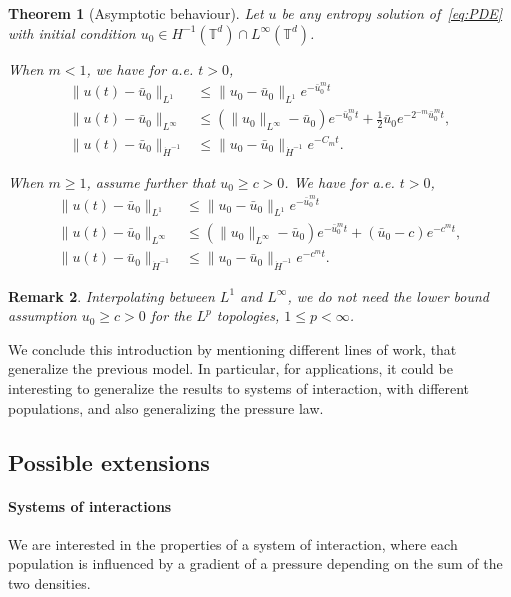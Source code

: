 \documentclass[11pt]{article}
\newtheorem{thm}{Theorem}[section]
\newtheorem{remark}[thm]{Remark}
\numberwithin{equation}{section} %
\newcommand{\T}{{\mathbb{T}}}
\def \hal{\frac{1}{2}}
\begin{document}
\begin{thm}[Asymptotic behaviour]\label{thm:asymptotic_behaviour} Let $u$ be any entropy solution of~\eqref{eq:PDE} with initial condition $u_{0}\in H^{-1}(\T^d)\cap L^{\infty}(\T^d)$. 

When $m<1$, we have for a.e. $t>0$,
\begin{align*}
    \|u(t)-\bar u_0\|_{L^1}   &\le \|u_0-\bar u_0\|_{L^1} e^{-\bar u_0^m t} \\
    \|u(t)-\bar{u}_{0}\|_{L^\infty} &\le (\|u_{0}\|_{L^\infty} - \bar{u}_{0}) e^{-\bar{u}_{0}^m t} + \hal \bar{u}_{0} e^{-2^{-m}\bar{u}_{0}^m t}, \\
    \|u(t)-\bar{u}_{0}\|_{\dot H^{-1}} &\le  \|u_{0}-\bar{u}_{0}\|_{\dot H^{-1}} e^{-C_m t}.
\end{align*}

When $m\ge 1$, assume further that $u_{0}\ge c>0$. We have for a.e. $t>0$,
    \begin{align*}
    \|u(t)-\bar u_0\|_{L^1}& \le \|u_0-\bar u_0\|_{L^1} e^{-\bar u_0^m t} \\
        \| u(t)-\bar{u}_{0}\|_{L^\infty} &\le (\|u_{0}\|_{L^\infty} - \bar{u}_{0}) e^{-\bar{u}_{0}^m t}  + (\bar{u}_{0}- c) e^{-c^mt}, \\
         \|u(t) -\bar{u}_{0}\|_{\dot H^{-1}} &\le \|u_{0} - \bar{u}_{0}\|_{\dot H^{-1}} e^{-c^mt}.
    \end{align*}
\end{thm}
\begin{remark}
    Interpolating between $L^1$ and $L^\infty$, we do not need the lower bound assumption $u_0 \ge c>0$ for the $L^p$ topologies, $1\le p <\infty$.
\end{remark}

We conclude this introduction by mentioning different lines of work, that generalize the previous model. In particular, for applications, it could be interesting to generalize the results to systems of interaction, with different populations, and also generalizing the pressure law.


\subsection{Possible extensions}


\paragraph{Systems of interactions}
We are interested in the properties of a system of interaction, where each population is influenced by a gradient of a pressure depending on the sum of the two densities.  
\end{document}
